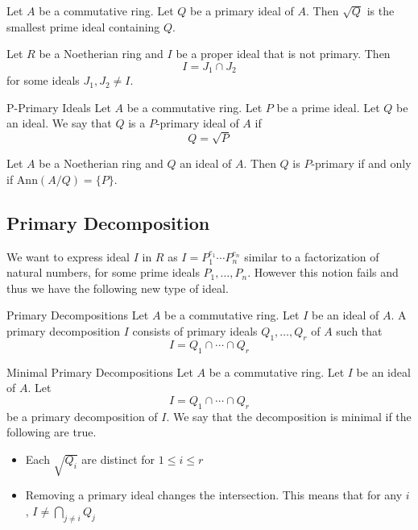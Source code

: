 \documentclass[a4paper]{article}
\begin{document}
\begin{lmm}{}{} Let $A$ be a commutative ring. Let $Q$ be a primary ideal of $A$. Then $\sqrt{Q}$ is the smallest prime ideal containing $Q$. 
\end{lmm}

\begin{lmm}{}{} Let $R$ be a Noetherian ring and $I$ be a proper ideal that is not primary. Then $$I=J_1\cap J_2$$ for some ideals $J_1,J_2\neq I$. 
\end{lmm}

\begin{defn}{P-Primary Ideals}{} Let $A$ be a commutative ring. Let $P$ be a prime ideal. Let $Q$ be an ideal. We say that $Q$ is a $P$-primary ideal of $A$ if $$Q=\sqrt{P}$$
\end{defn}

\begin{thm}{}{} Let $A$ be a Noetherian ring and $Q$ an ideal of $A$. Then $Q$ is $P$-primary if and only if $\text{Ann}(A/Q)=\{P\}$. 
\end{thm}

\subsection{Primary Decomposition}
We want to express ideal $I$ in $R$ as $I=P_1^{e_1}\cdots P_n^{e_n}$ similar to a factorization of natural numbers, for some prime ideals $P_1,\dots,P_n$. However this notion fails and thus we have the following new type of ideal. 

\begin{defn}{Primary Decompositions}{} Let $A$ be a commutative ring. Let $I$ be an ideal of $A$. A primary decomposition $I$ consists of primary ideals $Q_1,\dots,Q_r$ of $A$ such that $$I=Q_1\cap\cdots\cap Q_r$$
\end{defn}

\begin{defn}{Minimal Primary Decompositions}{} Let $A$ be a commutative ring. Let $I$ be an ideal of $A$. Let $$I=Q_1\cap\cdots\cap Q_r$$ be a primary decomposition of $I$. We say that the decomposition is minimal if the following are true. 
\begin{itemize}
\item Each $\sqrt{Q_i}$ are distinct for $1\leq i\leq r$
\item Removing a primary ideal changes the intersection. This means that for any $i$, $I\neq\bigcap_{j\neq i}Q_j$
\end{itemize}
\end{defn}
\end{document}
